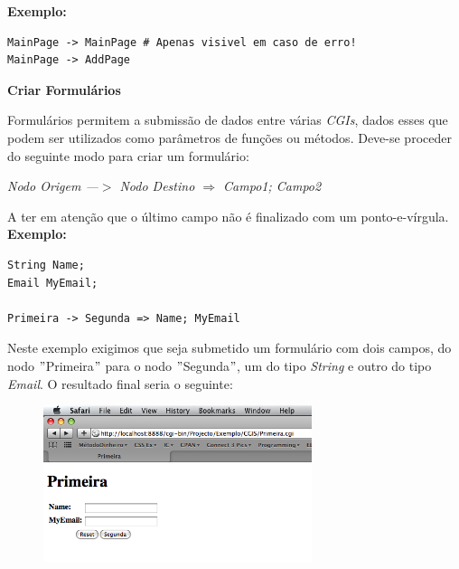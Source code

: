 \documentclass[a4paper]{article}
\begin{document}
\textbf{Exemplo:}

\begin{small}
\begin{lstlisting}
MainPage -> MainPage # Apenas visivel em caso de erro!
MainPage -> AddPage
\end{lstlisting}
\end{small}

\vspace{.2cm}

\begin{normalsize}
\textbf{Criar Formulários}\\
\end{normalsize}

\hspace{1cm}Formulários permitem a submissão de dados entre várias \emph{CGIs}, dados esses que podem ser utilizados como parâmetros de
funções ou métodos. Deve-se proceder do seguinte modo para criar um formulário:

\begin{center}
\emph{Nodo Origem —$>$ Nodo Destino $\Rightarrow$
        Campo1;
        Campo2}
\end{center}

A ter em atenção que o último campo não é finalizado com um ponto-e-vírgula.\\

\textbf{Exemplo:}

\begin{small}
\begin{lstlisting}
String Name;
Email MyEmail;

Primeira -> Segunda => Name; MyEmail
\end{lstlisting}
\end{small}

\vspace{.2cm}

Neste exemplo exigimos que seja submetido um formulário com dois campos, do nodo $"$Primeira$"$ para o nodo $"$Segunda$"$, um do
tipo \emph{String} e outro do tipo \emph{Email}. O resultado final seria o seguinte:\\

\begin{figure}[!ht]
\begin{center}
\includegraphics[width=0.7\textwidth]{./Images/Form.png}
\end{center}
\end{figure}
\end{document}
